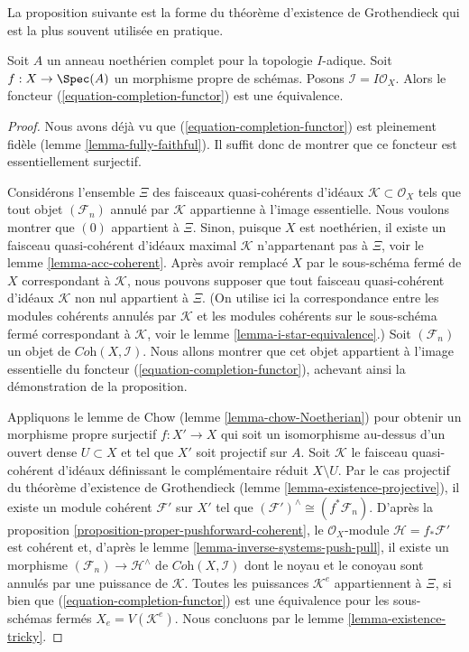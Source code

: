 \noindent
La proposition suivante est la forme du théorème d'existence de
Grothendieck qui est la plus souvent utilisée en pratique.

\begin{proposition}
\label{proposition-existence-proper}
Soit $A$ un anneau noethérien complet pour la topologie $I$-adique.
Soit $f : X \to \Spec(A)$ un morphisme propre de schémas.
Posons $\mathcal{I} = I\mathcal{O}_X$.
Alors le foncteur (\ref{equation-completion-functor}) est une équivalence.
\end{proposition}

\begin{proof}
Nous avons déjà vu que (\ref{equation-completion-functor}) est
pleinement fidèle (lemme \ref{lemma-fully-faithful}). Il suffit donc
de montrer que ce foncteur est essentiellement surjectif.

\medskip\noindent
Considérons l'ensemble $\Xi$ des faisceaux quasi-cohérents d'idéaux
$\mathcal{K} \subset \mathcal{O}_X$ tels que tout objet
$(\mathcal{F}_n)$ annulé par $\mathcal{K}$ appartienne à l'image essentielle.
Nous voulons montrer que $(0)$ appartient à $\Xi$. Sinon, puisque $X$ est noethérien,
il existe un faisceau quasi-cohérent d'idéaux maximal $\mathcal{K}$
n'appartenant pas à $\Xi$, voir le
lemme \ref{lemma-acc-coherent}.
Après avoir remplacé $X$ par le sous-schéma fermé de $X$
correspondant à $\mathcal{K}$, nous pouvons supposer que tout faisceau quasi-cohérent d'idéaux
$\mathcal{K}$ non nul appartient à $\Xi$. (On utilise ici la correspondance entre
les modules cohérents annulés par $\mathcal{K}$ et les modules
cohérents sur le sous-schéma fermé correspondant à $\mathcal{K}$, voir le
lemme \ref{lemma-i-star-equivalence}.)
Soit $(\mathcal{F}_n)$ un objet de
$\textit{Coh}(X, \mathcal{I})$.
Nous allons montrer que cet objet appartient à l'image essentielle du
foncteur (\ref{equation-completion-functor}), achevant ainsi la
démonstration de la proposition.

\medskip\noindent
Appliquons le lemme de Chow (lemme \ref{lemma-chow-Noetherian}) pour obtenir un
morphisme propre surjectif $f : X' \to X$ qui soit un isomorphisme
au-dessus d'un ouvert dense $U \subset X$ et tel que $X'$ soit projectif sur $A$.
Soit $\mathcal{K}$ le faisceau quasi-cohérent d'idéaux définissant
le complémentaire réduit $X \setminus U$. Par le cas
projectif du théorème d'existence de Grothendieck
(lemme \ref{lemma-existence-projective}),
il existe un module cohérent $\mathcal{F}'$ sur $X'$ tel
que $(\mathcal{F}')^\wedge \cong (f^*\mathcal{F}_n)$. D'après la
proposition \ref{proposition-proper-pushforward-coherent},
le $\mathcal{O}_X$-module $\mathcal{H} = f_*\mathcal{F}'$ est cohérent
et, d'après le lemme \ref{lemma-inverse-systems-push-pull},
il existe un morphisme $(\mathcal{F}_n) \to \mathcal{H}^\wedge$
de $\textit{Coh}(X, \mathcal{I})$ dont le noyau et le conoyau
sont annulés par une puissance de $\mathcal{K}$. Toutes les puissances $\mathcal{K}^e$
appartiennent à $\Xi$, si bien que (\ref{equation-completion-functor})
est une équivalence pour les sous-schémas fermés $X_e = V(\mathcal{K}^e)$.
Nous concluons par le lemme \ref{lemma-existence-tricky}.
\end{proof}





